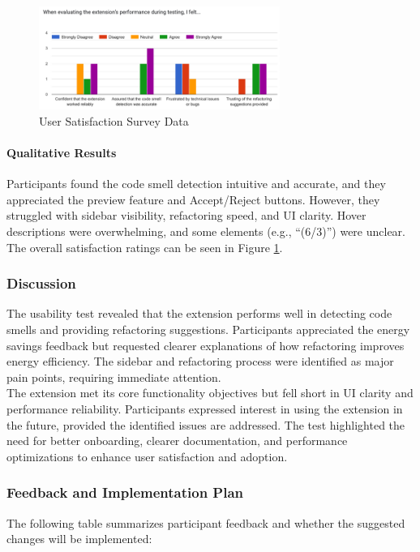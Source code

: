 \documentclass[12pt, titlepage]{article}
\begin{document}
\begin{figure}[H]
  \centering
  \includegraphics[width=0.7\textwidth]{../Images/usability-satisfaction-graph.png}
  \caption{User Satisfaction Survey Data}
  \label{img:usability-satisfaction}
\end{figure}

\paragraph{Qualitative Results}
Participants found the code smell detection intuitive and accurate,
and they appreciated the preview feature and Accept/Reject buttons.
However, they struggled with sidebar visibility, refactoring speed,
and UI clarity. Hover descriptions were overwhelming, and some
elements (e.g., ``(6/3)'') were unclear. The overall satisfaction ratings can be seen in Figure \ref{img:usability-satisfaction}.

\subsubsection{Discussion}
The usability test revealed that the extension performs well in
detecting code smells and providing refactoring suggestions.
Participants appreciated the energy savings feedback but requested
clearer explanations of how refactoring improves energy efficiency.
The sidebar and refactoring process were identified as major pain
points, requiring immediate attention.\\

The extension met its core functionality objectives but fell short in
UI clarity and performance reliability. Participants expressed
interest in using the extension in the future, provided the
identified issues are addressed. The test highlighted the need for
better onboarding, clearer documentation, and performance
optimizations to enhance user satisfaction and adoption.

\subsubsection{Feedback and Implementation Plan}
The following table summarizes participant feedback and whether the
suggested changes will be implemented:
\end{document}
